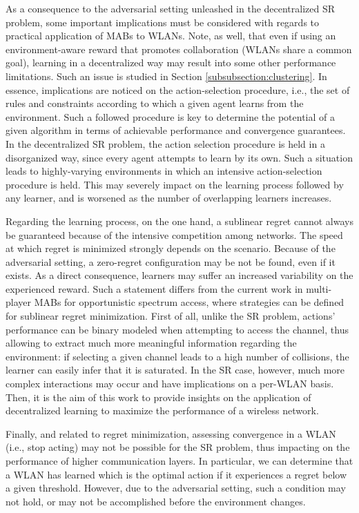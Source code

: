 \documentclass[preprint,12pt]{elsarticle}
\begin{document}
As a consequence to the adversarial setting unleashed in the decentralized SR problem, some important implications must be considered with regards to practical application of MABs to WLANs. Note, as well, that even if using an environment-aware reward that promotes collaboration (WLANs share a common goal), learning in a decentralized way may result into some other performance limitations. Such an issue is studied in Section \ref{subsubsection:clustering}. In essence, implications are noticed on the action-selection procedure, i.e., the set of rules and constraints according to which a given agent learns from the environment. Such a followed procedure is key to determine the potential of a given algorithm in terms of achievable performance and convergence guarantees. In the decentralized SR problem, the action selection procedure is held in a disorganized way, since every agent attempts to learn by its own. Such a situation leads to highly-varying environments in which an intensive action-selection procedure is held. This may severely impact on the learning process followed by any learner, and is worsened as the number of overlapping learners increases.

Regarding the learning process, on the one hand, a sublinear regret cannot always be guaranteed because of the intensive competition among networks. The speed at which regret is minimized strongly depends on the scenario. Because of the adversarial setting, a zero-regret configuration may be not be found, even if it exists. As a direct consequence, learners may suffer an increased variability on the experienced reward. Such a statement differs from the current work in multi-player MABs for opportunistic spectrum access, where strategies can be defined for sublinear regret minimization. First of all, unlike the SR problem, actions' performance can be binary modeled when attempting to access the channel, thus allowing to extract much more meaningful information regarding the environment: if selecting a given channel leads to a high number of collisions, the learner can easily infer that it is saturated. In the SR case, however, much more complex interactions may occur and have implications on a per-WLAN basis. Then, it is the aim of this work to provide insights on the application of decentralized learning to maximize the performance of a wireless network.

Finally, and related to regret minimization, assessing convergence in a WLAN (i.e., stop acting) may not be possible for the SR problem, thus impacting on the performance of higher communication layers. In particular, we can determine that a WLAN has learned which is the optimal action if it experiences a regret below a given threshold. However, due to the adversarial setting, such a condition may not hold, or may not be accomplished before the environment changes. 
\end{document}

